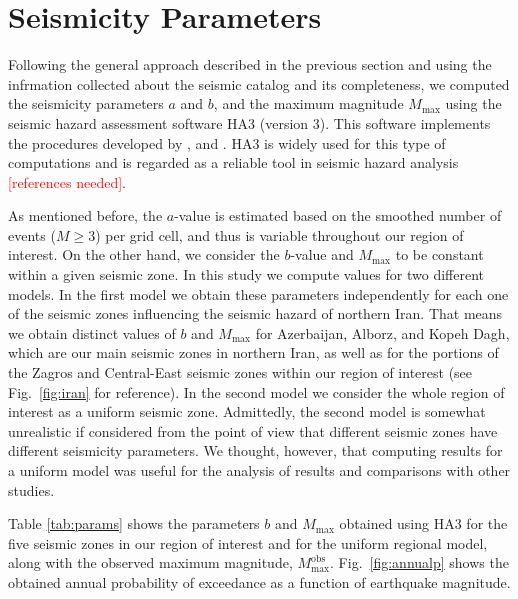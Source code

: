 \section{Seismicity Parameters}

Following the general approach described in the previous section and using the infrmation collected about the seismic catalog and its completeness, we computed the seismicity parameters $a$ and $b$, and the maximum magnitude $M_{\max}$ using the seismic hazard assessment software HA3 (version 3). This software implements the procedures developed by \citet{Kijko_1989_BSSA, Kijko_1992_BSSA}, and \citet{Kijko_2004_PAG}. HA3 is widely used for this type of computations and is regarded as a reliable tool in seismic hazard analysis \citep[see, for instance,][]{}\textcolor{red}{[references needed]}.

As mentioned before, the $a$-value is estimated based on the smoothed number of events ($M \geq 3$) per grid cell, and thus is variable throughout our region of interest. On the other hand, we consider the $b$-value and $M_{\max}$ to be constant within a given seismic zone. In this study we compute values for two different models. In the first model we obtain these parameters independently for each one of the seismic zones influencing the seismic hazard of northern Iran. That means we obtain distinct values of $b$ and $M_{\max}$ for Azerbaijan, Alborz, and Kopeh Dagh, which are our main seismic zones in northern Iran, as well as for the portions of the Zagros and Central-East seismic zones within our region of interest (see Fig.~\ref{fig:iran} for reference). In the second model we consider the whole region of interest as a uniform seismic zone. Admittedly, the second model is somewhat unrealistic if considered from the point of view that different seismic zones have different seismicity parameters. We thought, however, that computing results for a uniform model was useful for the analysis of results and comparisons with other studies.

Table \ref{tab:params} shows the parameters $b$ and $M_{\max}$ obtained using HA3 for the five seismic zones in our region of interest and for the uniform regional model, along with the observed maximum magnitude, $M_{\max}^{\mathrm{obs}}$. Fig.~\ref{fig:annualp} shows the obtained annual probability of exceedance as a function of earthquake magnitude.


